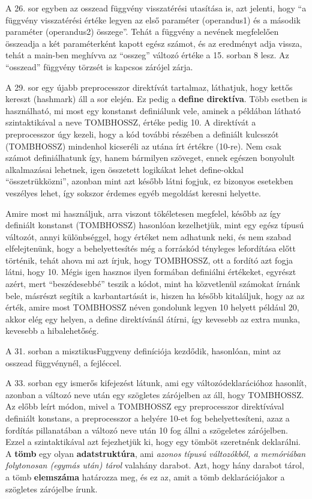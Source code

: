 A 26. sor egyben az osszead függvény visszatérési utasítása is, azt jelenti, hogy ``a függvény visszatérési értéke legyen az első paraméter (operandus1) és a második paraméter (operandus2) összege''. Tehát a függvény a nevének megfelelően összeadja a két paraméterként kapott egész számot, és az eredményt adja vissza, tehát a main-ben meghívva az ``osszeg'' változó értéke a 15. sorban 8 lesz. Az ``osszead'' függvény törzsét is kapcsos zárójel zárja.

A 29. sor egy újabb preprocesszor direktívát tartalmaz, láthatjuk, hogy kettős kereszt (hashmark) áll a sor elején. Ez pedig a \textbf{define direktíva}. Több esetben is használható, mi most egy konstanst definiálunk vele, aminek a példában látható szintaktikával a neve TOMB\textunderscore HOSSZ, értéke pedig 10. A direktívát a preprocesszor úgy kezeli, hogy a kód további részében a definiált kulcsszót (TOMB\textunderscore HOSSZ) mindenhol kicseréli az utána írt értékre (10-re). Nem csak számot definiálhatunk így, hanem bármilyen szöveget, ennek egészen bonyolult alkalmazásai lehetnek, igen összetett logikákat lehet define-okkal ``összetrükközni'', azonban mint azt később látni fogjuk, ez bizonyos esetekben veszélyes lehet, így sokszor érdemes egyéb megoldást keresni helyette.

Amire most mi használjuk, arra viszont tökéletesen megfelel, később az így definiált konstanst (TOMB\textunderscore HOSSZ) hasonlóan kezelhetjük, mint egy egész típusú változót, annyi különbséggel, hogy értéket nem adhatunk neki, és nem szabad elfelejtenünk, hogy a behelyettesítés még a forráskód tényleges lefordítása előtt történik, tehát ahova mi azt írjuk, hogy TOMB\textunderscore HOSSZ, ott a fordító azt fogja látni, hogy 10. Mégis igen hasznos ilyen formában definiálni értékeket, egyrészt azért, mert ``beszédesebbé'' teszik a kódot, mint ha közvetlenül számokat írnánk bele, másrészt segítik a karbantartását is, hiszen ha később kitaláljuk, hogy az az érték, amire most TOMB\textunderscore HOSSZ néven gondolunk legyen 10 helyett például 20, akkor elég egy helyen, a define direktívánál átírni, így kevesebb az extra munka, kevesebb a hibalehetőség.

A 31. sorban a misztikusFuggveny definíciója kezdődik, hasonlóan, mint az osszead függvénynél, a fejléccel.

A 33. sorban egy ismerős kifejezést látunk, ami egy változódeklarációhoz hasonlít, azonban a változó neve után egy szögletes zárójelben az áll, hogy TOMB\textunderscore HOSSZ. Az előbb leírt módon, mivel a TOMB\textunderscore HOSSZ egy preprocesszor direktívával definiált konstans, a preprocesszor a helyére 10-et fog behelyettesíteni, azaz a fordítás pillanatában a változó neve után 10 fog állni a szögeletes zárójelben. Ezzel a szintaktikával azt fejezhetjük ki, hogy egy tömböt szeretnénk deklarálni. A \textbf{tömb} egy olyan \textbf{adatstruktúra}, ami \emph{azonos típusú változókból, a memóriában folytonosan (egymás után) tárol} valahány darabot. Azt, hogy hány darabot tárol, a tömb \textbf{elemszáma} határozza meg, és ez az, amit a tömb deklarációjakor a szögletes zárójelbe írunk.

